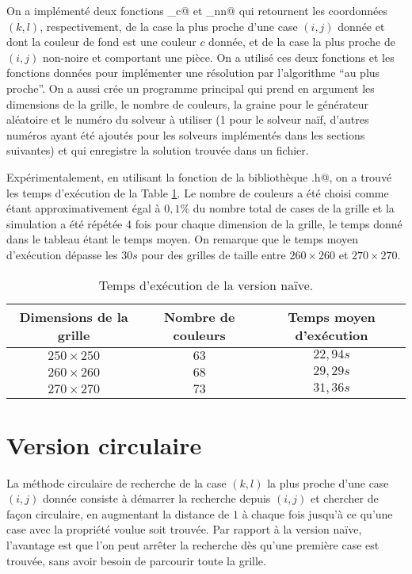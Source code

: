 \documentclass[a4paper,12pt]{article}
\numberwithin{equation}{section}
\begin{document}
On a implémenté deux fonctions \verb@RechercheCaseNaif_c@ et \verb@RechercheCaseNaif_nn@ qui retournent les coordonnées $(k, l)$, respectivement, de la case la plus proche d'une case $(i, j)$ donnée et dont la couleur de fond est une couleur $c$ donnée, et de la case la plus proche de $(i, j)$ non-noire et comportant une pièce. On a utilisé ces deux fonctions et les fonctions données pour implémenter une résolution par l'algorithme ``au plus proche''. On a aussi crée un programme principal \verb@Solveur@ qui prend en argument les dimensions de la grille, le nombre de couleurs, la graine pour le générateur aléatoire et le numéro du solveur à utiliser (1 pour le solveur naïf, d'autres numéros ayant été ajoutés pour les solveurs implémentés dans les sections suivantes) et qui enregistre la solution trouvée dans un fichier.

Expérimentalement, en utilisant la fonction \verb@clock@ de la bibliothèque \verb@time.h@, on a trouvé les temps d'exécution de la Table \ref{TempsNaive}. Le nombre de couleurs a été choisi comme étant approximativement égal à $0,1\%$ du nombre total de cases de la grille et la simulation a été répétée 4 fois pour chaque dimension de la grille, le temps donné dans le tableau étant le temps moyen. On remarque que le temps moyen d'exécution dépasse les $30 s$ pour des grilles de taille entre $260 \times 260$ et $270 \times 270$.

\begin{table}[ht]
\centering
\begin{tabular}{ccc}
\hline\hline
Dimensions de la grille & Nombre de couleurs & Temps moyen d'exécution \tabularnewline
\hline
$250 \times 250$ & $63$ & $22,94 s$ \tabularnewline
$260 \times 260$ & $68$ & $29,29 s$ \tabularnewline
$270 \times 270$ & $73$ & $31,36 s$ \tabularnewline
\hline\hline
\end{tabular}
\caption{Temps d'exécution de la version naïve.}
\label{TempsNaive}
\end{table}

\section{Version circulaire}

La méthode circulaire de recherche de la case $(k, l)$ la plus proche d'une case $(i, j)$ donnée consiste à démarrer la recherche depuis $(i, j)$ et chercher de façon circulaire, en augmentant la distance de $1$ à chaque fois jusqu'à ce qu'une case avec la propriété voulue soit trouvée. Par rapport à la version naïve, l'avantage est que l'on peut arrêter la recherche dès qu'une première case est trouvée, sans avoir besoin de parcourir toute la grille.
\end{document}
